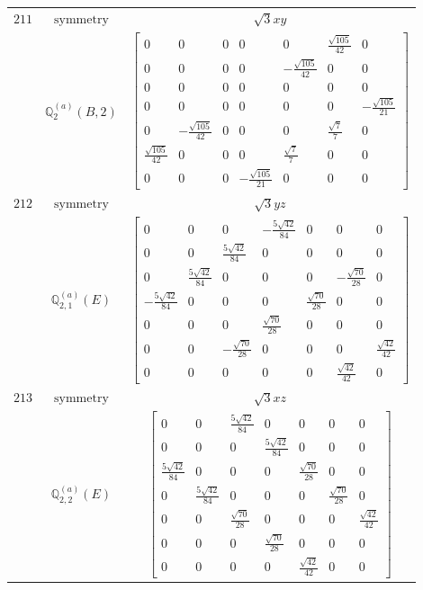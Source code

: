 \documentclass[fleqn,8pt,landscape]{jsarticle}
\begin{document}
\begin{longtable}{ccc}
$ 211 $ & $ \text{symmetry} $ & $ \sqrt{3} x y $ \\
$  $ & $ \mathbb{Q}_{2}^{(a)}(B,2) $ & $ \begin{bmatrix} 0 & 0 & 0 & 0 & 0 & \frac{\sqrt{105}}{42} & 0 \\ 0 & 0 & 0 & 0 & - \frac{\sqrt{105}}{42} & 0 & 0 \\ 0 & 0 & 0 & 0 & 0 & 0 & 0 \\ 0 & 0 & 0 & 0 & 0 & 0 & - \frac{\sqrt{105}}{21} \\ 0 & - \frac{\sqrt{105}}{42} & 0 & 0 & 0 & \frac{\sqrt{7}}{7} & 0 \\ \frac{\sqrt{105}}{42} & 0 & 0 & 0 & \frac{\sqrt{7}}{7} & 0 & 0 \\ 0 & 0 & 0 & - \frac{\sqrt{105}}{21} & 0 & 0 & 0 \end{bmatrix} $ \\ \hline
$ 212 $ & $ \text{symmetry} $ & $ \sqrt{3} y z $ \\
$  $ & $ \mathbb{Q}_{2,1}^{(a)}(E) $ & $ \begin{bmatrix} 0 & 0 & 0 & - \frac{5 \sqrt{42}}{84} & 0 & 0 & 0 \\ 0 & 0 & \frac{5 \sqrt{42}}{84} & 0 & 0 & 0 & 0 \\ 0 & \frac{5 \sqrt{42}}{84} & 0 & 0 & 0 & - \frac{\sqrt{70}}{28} & 0 \\ - \frac{5 \sqrt{42}}{84} & 0 & 0 & 0 & \frac{\sqrt{70}}{28} & 0 & 0 \\ 0 & 0 & 0 & \frac{\sqrt{70}}{28} & 0 & 0 & 0 \\ 0 & 0 & - \frac{\sqrt{70}}{28} & 0 & 0 & 0 & \frac{\sqrt{42}}{42} \\ 0 & 0 & 0 & 0 & 0 & \frac{\sqrt{42}}{42} & 0 \end{bmatrix} $ \\ \hline
$ 213 $ & $ \text{symmetry} $ & $ \sqrt{3} x z $ \\
$  $ & $ \mathbb{Q}_{2,2}^{(a)}(E) $ & $ \begin{bmatrix} 0 & 0 & \frac{5 \sqrt{42}}{84} & 0 & 0 & 0 & 0 \\ 0 & 0 & 0 & \frac{5 \sqrt{42}}{84} & 0 & 0 & 0 \\ \frac{5 \sqrt{42}}{84} & 0 & 0 & 0 & \frac{\sqrt{70}}{28} & 0 & 0 \\ 0 & \frac{5 \sqrt{42}}{84} & 0 & 0 & 0 & \frac{\sqrt{70}}{28} & 0 \\ 0 & 0 & \frac{\sqrt{70}}{28} & 0 & 0 & 0 & \frac{\sqrt{42}}{42} \\ 0 & 0 & 0 & \frac{\sqrt{70}}{28} & 0 & 0 & 0 \\ 0 & 0 & 0 & 0 & \frac{\sqrt{42}}{42} & 0 & 0 \end{bmatrix} $ \\ \hline

\end{longtable}
\end{document}
